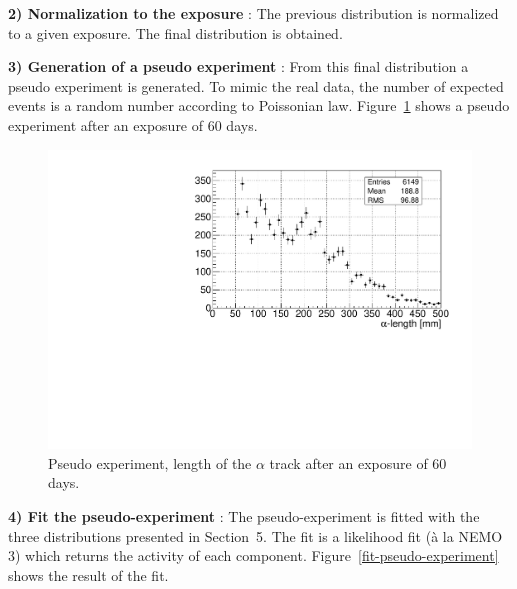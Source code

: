 \documentclass[main.tex]{subfiles}
\begin{document}
\noindent \textbf{2) Normalization to the exposure} : The previous distribution is normalized to a given exposure. The final distribution is obtained.


\bigskip


\noindent \textbf{3) Generation of a pseudo experiment} : From this final distribution a pseudo experiment is generated. To mimic the real data, the number of expected events is a random number according to Poissonian law. Figure~\ref{pseudo-experiment} shows a pseudo experiment after an exposure of 60 days.


\begin{figure}[h!]
\begin{center}
\includegraphics[scale=0.6]{pictures/Chap5/alph_length_exposure_60.pdf}
\caption{Pseudo experiment, length of the $\alpha$ track after an exposure of 60 days.}
\label{pseudo-experiment}
\end{center}
\end{figure}


\bigskip


\noindent \textbf{4) Fit the pseudo-experiment} : The pseudo-experiment is fitted with the three distributions presented in Section~5. The fit is a likelihood fit (\`a la NEMO 3) which returns the activity of each component. Figure~\ref{fit-pseudo-experiment} shows the result of the fit.
\end{document}
